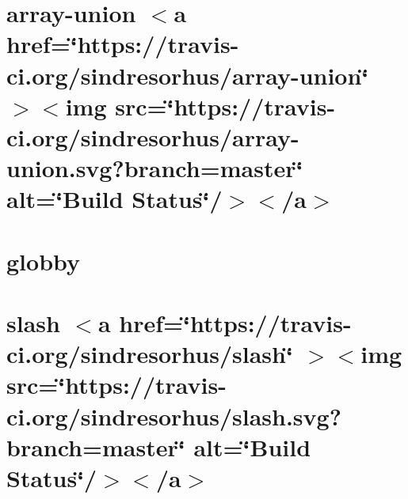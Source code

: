 \documentclass[twoside]{book}
\newcommand{\+}{\discretionary{\mbox{\scriptsize$\hookleftarrow$}}{}{}}
\begin{document}
\chapter{array-\/union \texorpdfstring{$<$}{<}a href=\char`\"{}https\+://travis-\/ci.\+org/sindresorhus/array-\/union\char`\"{} \texorpdfstring{$>$}{>}\texorpdfstring{$<$}{<}img src=\char`\"{}https\+://travis-\/ci.\+org/sindresorhus/array-\/union.\+svg?branch=master\char`\"{} alt=\char`\"{}\+Build Status\char`\"{}/\texorpdfstring{$>$}{>}\texorpdfstring{$<$}{<}/a\texorpdfstring{$>$}{>}}
\label{md__c___users_vaishnavi_jadhav__desktop__developer_code_mean_stack_example_client_node_modules_d7ea5edd734c7383e7a27413f460aabe4}

\chapter{globby}
\label{md__c___users_vaishnavi_jadhav__desktop__developer_code_mean_stack_example_client_node_modules_del_node_modules_globby_readme}

\chapter{slash \texorpdfstring{$<$}{<}a href=\char`\"{}https\+://travis-\/ci.\+org/sindresorhus/slash\char`\"{} \texorpdfstring{$>$}{>}\texorpdfstring{$<$}{<}img src=\char`\"{}https\+://travis-\/ci.\+org/sindresorhus/slash.\+svg?branch=master\char`\"{} alt=\char`\"{}\+Build Status\char`\"{}/\texorpdfstring{$>$}{>}\texorpdfstring{$<$}{<}/a\texorpdfstring{$>$}{>}}
\label{md__c___users_vaishnavi_jadhav__desktop__developer_code_mean_stack_example_client_node_modules_del_node_modules_slash_readme}

\end{document}
